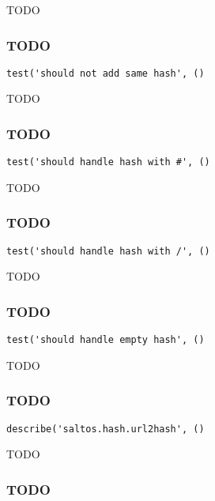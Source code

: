 \documentclass[a4paper]{article}
\begin{document}
TODO

\hypertarget{toc649}{}
\subsubsection{TODO}

\begin{lstlisting}
test('should not add same hash', ()
\end{lstlisting}

TODO

\hypertarget{toc650}{}
\subsubsection{TODO}

\begin{lstlisting}
test('should handle hash with #', ()
\end{lstlisting}

TODO

\hypertarget{toc651}{}
\subsubsection{TODO}

\begin{lstlisting}
test('should handle hash with /', ()
\end{lstlisting}

TODO

\hypertarget{toc652}{}
\subsubsection{TODO}

\begin{lstlisting}
test('should handle empty hash', ()
\end{lstlisting}

TODO

\hypertarget{toc653}{}
\subsubsection{TODO}

\begin{lstlisting}
describe('saltos.hash.url2hash', ()
\end{lstlisting}

TODO

\hypertarget{toc654}{}
\subsubsection{TODO}
\end{document}
